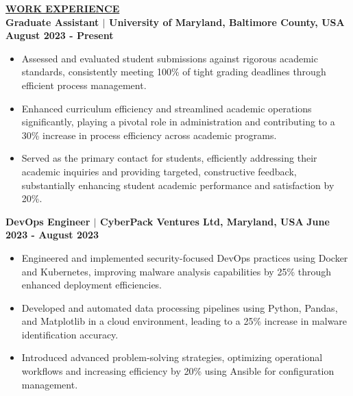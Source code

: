 \documentclass{article}
\begin{document}
\noindent \textbf{\underline{WORK EXPERIENCE}} \\
\noindent \textbf{Graduate Assistant $\mid$ University of Maryland, Baltimore County, USA}  \hfill \textbf{August 2023 - Present}
\begin{itemize}[noitemsep,nolistsep,leftmargin=*]
\item {\small Assessed and evaluated student submissions against rigorous academic standards, consistently meeting 100\% of tight grading deadlines through efficient process management.}
\item {\small Enhanced curriculum efficiency and streamlined academic operations significantly, playing a pivotal role in administration and contributing to a 30\% increase in process efficiency across academic programs.}
\item {\small Served as the primary contact for students, efficiently addressing their academic inquiries and providing targeted, constructive feedback, substantially enhancing student academic performance and satisfaction by 20\%.}\\
\end{itemize}


\noindent \textbf{DevOps Engineer $\mid$ CyberPack Ventures Ltd, Maryland, USA} \hfill \textbf{June 2023 - August 2023}
\begin{itemize}[noitemsep,nolistsep,leftmargin=*]
\item {\small Engineered and implemented security-focused DevOps practices using Docker and Kubernetes, improving malware analysis capabilities by 25\% through enhanced deployment efficiencies.}
\item {\small Developed and automated data processing pipelines using Python, Pandas, and Matplotlib in a cloud environment, leading to a 25\% increase in malware identification accuracy.}
\item {\small Introduced advanced problem-solving strategies, optimizing operational workflows and increasing efficiency by 20\% using Ansible for configuration management.}\
\end{itemize}
\end{document}
